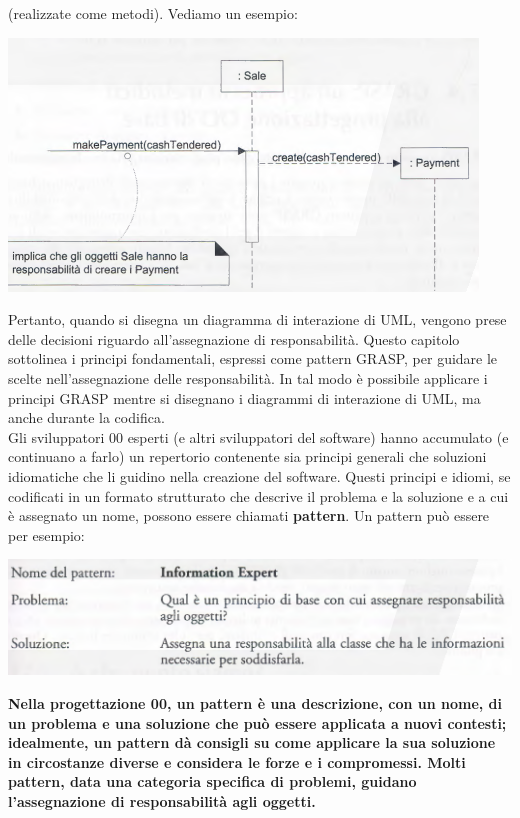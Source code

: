 \documentclass[a4paper,12pt, oneside]{book}
\begin{document}
(realizzate come metodi). Vediamo un esempio:
\begin{center}
\includegraphics[scale = 0.7]{img/grasp2.png}
\end{center}
Pertanto, quando si disegna un diagramma di interazione di UML, vengono prese delle
decisioni riguardo all'assegnazione di responsabilità. Questo capitolo sottolinea i principi
fondamentali, espressi come pattern GRASP, per guidare le scelte nell'assegnazione delle
responsabilità. In tal modo è possibile applicare i principi GRASP mentre si disegnano i
diagrammi di interazione di UML, ma anche durante la codifica.\\
Gli sviluppatori 00 esperti (e altri sviluppatori del software) hanno accumulato (e continuano a farlo) un repertorio contenente sia principi generali che soluzioni idiomatiche
che li guidino nella creazione del software. Questi principi e idiomi, se codificati in un
formato strutturato che descrive il problema e la soluzione e a cui è assegnato un nome,
possono essere chiamati \textbf{pattern}. Un pattern può essere per esempio:
\begin{center}
\includegraphics[scale = 0.7]{img/grasp3.png}
\end{center}
\textbf{Nella progettazione 00, un pattern è una descrizione, con un nome, di un problema
e una soluzione che può essere applicata a nuovi contesti; idealmente, un pattern dà
consigli su come applicare la sua soluzione in circostanze diverse e considera le forze e i
compromessi. Molti pattern, data una categoria specifica di problemi, guidano l'assegnazione di responsabilità agli oggetti.}
\end{document}
